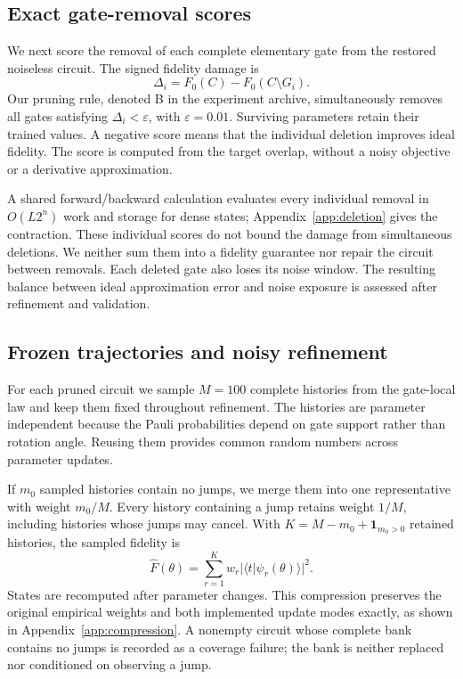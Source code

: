 \subsection{Exact gate-removal scores}
\label{sec:pruning}

We next score the removal of each complete elementary gate from the restored noiseless circuit. The signed fidelity damage is
\begin{equation}
    \Delta_i=F_0(C)-F_0(C\setminus G_i).
    \label{eq:deletion}
\end{equation}
Our pruning rule, denoted B in the experiment archive, simultaneously removes all gates satisfying $\Delta_i<\varepsilon$, with $\varepsilon=0.01$. Surviving parameters retain their trained values. A negative score means that the individual deletion improves ideal fidelity. The score is computed from the target overlap, without a noisy objective or a derivative approximation.

A shared forward/backward calculation evaluates every individual removal in $O(L2^n)$ work and storage for dense states; Appendix~\ref{app:deletion} gives the contraction. These individual scores do not bound the damage from simultaneous deletions. We neither sum them into a fidelity guarantee nor repair the circuit between removals. Each deleted gate also loses its noise window. The resulting balance between ideal approximation error and noise exposure is assessed after refinement and validation.

\subsection{Frozen trajectories and noisy refinement}
\label{sec:refinement}

For each pruned circuit we sample $M=100$ complete histories from the gate-local law and keep them fixed throughout refinement. The histories are parameter independent because the Pauli probabilities depend on gate support rather than rotation angle. Reusing them provides common random numbers across parameter updates.

If $m_0$ sampled histories contain no jumps, we merge them into one representative with weight $m_0/M$. Every history containing a jump retains weight $1/M$, including histories whose jumps may cancel. With $K=M-m_0+\mathbf 1_{m_0>0}$ retained histories, the sampled fidelity is
\begin{equation}
    \widehat F(\theta)=\sum_{r=1}^{K}w_r
    |\langle t|\psi_r(\theta)\rangle|^2.
    \label{eq:weighted_fidelity}
\end{equation}
States are recomputed after parameter changes. This compression preserves the original empirical weights and both implemented update modes exactly, as shown in Appendix~\ref{app:compression}. A nonempty circuit whose complete bank contains no jumps is recorded as a coverage failure; the bank is neither replaced nor conditioned on observing a jump.


